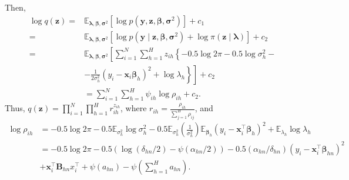 \begin{enumerate}[leftmargin=*]
Then,
\begin{align*}
	\log q(\bm{z})=&\mathbb{E}_{\bm{\lambda},\bm{\beta},\bm{\sigma}^2}\left[\log p(\bm{y},\bm{z},\bm{\beta},\bm{\sigma}^2)\right] + c_1\\
	=&\mathbb{E}_{\bm{\lambda},\bm{\beta},\bm{\sigma}^2}\left[\log p(\bm{y}\mid\bm{z},\bm{\beta},\bm{\sigma}^2)+\log \pi(\bm{z}\mid\bm{\lambda})\right] + c_2\\
	=&\mathbb{E}_{\bm{\lambda},\bm{\beta},\bm{\sigma}^2}\left[\sum_{i=1}^N\sum_{h=1}^H z_{ih}\left\{-0.5\log 2\pi - 0.5 \log \sigma^2_h - \right.\right.\\
	&\left.\left.-\frac{1}{2\sigma^2_h}(y_i-\bm{x}_i\bm{\beta}_h)^2 + \log\lambda_h\right\}\right] + c_2\\
	&=\sum_{i=1}^N\sum_{h=1}^H\psi_{ih}\log \rho_{ih} + c_2.
\end{align*}
Thus, $q(\bm{z})=\prod_{i=1}^N\prod_{h=1}^H r_{ih}^{z_{ih}}$,  
where $r_{ih}=\frac{\rho_{ih}}{\sum_{j=1}^H\rho_{ij}}$, and
\begin{align*}
	\log \rho_{ih}&=-0.5\log 2\pi -0.5\mathbb{E}_{\sigma^2_h} \log \sigma_h^2 - 0.5 \mathbb{E}_{\sigma^2_h}\left(\frac{1}{\sigma^2_h}\right)\mathbb{E}_{\bm{\beta}_h}(y_i-\bm{x}_i^{\top}\bm{\beta}_h)^2 + \mathbb{E}_{\lambda_h}\log \lambda_h\\
	&=-0.5\log 2\pi - 0.5(\log(\delta_{hn}/2)-\psi(\alpha_{hn}/2)) - 0.5(\alpha_{hn}/\delta_{hn})(y_i-\bm{x}_i^{\top}\bm{\beta}_{hn})^2\\
	&+\bm{x}_i^{\top}\bm{B}_{hn}x_i^{\top} + \psi(a_{hn}) - \psi\left(\sum_{h=1}^Ha_{hn}\right).
\end{align*}
  
\end{enumerate}